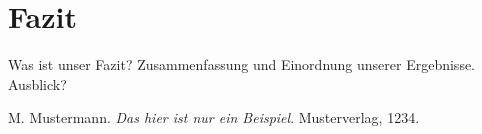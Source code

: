 \documentclass[a4,german]{article}
\begin{document}
\section{Fazit}

Was ist unser Fazit?
Zusammenfassung und Einordnung unserer Ergebnisse.
Ausblick?



\begin{thebibliography}{99}
	
 M. Mustermann. \textit{Das hier ist nur ein Beispiel}. Musterverlag, 1234.

\end{thebibliography}
\end{document}
